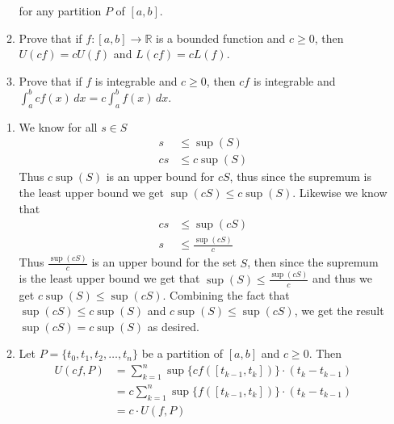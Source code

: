 \documentclass[11pt]{exam}
\newcommand{\sntk}{\sum_{k=1}^{n}}
\begin{document}
\begin{enumerate}
\begin{enumerate}
                for any partition \( P \) of \( [a, b] \).
                \item Prove that if \( f : [a, b] \rightarrow \mathbb{R} \) is a bounded function and \( c \geq 0 \), then \( U(cf) = cU(f) \) and \( L(cf) = cL(f) \).
                \item Prove that if \( f \) is integrable and \( c \geq 0 \), then \( cf \) is integrable and
                \( \int_{a}^{b} cf(x) \,dx = c \int_{a}^{b} f(x) \,dx \).
            \end{enumerate}
                \begin{solution}
                    \begin{enumerate}
                        \item We know for all $s \in S$
                            \begin{align*}
                                s &\leq \sup(S) \\
                                cs &\leq c\sup(S) 
                            \end{align*}
                            Thus $c\sup(S)$ is an upper bound for $cS$, thus since the supremum is the least upper bound we get $\sup(cS) \leq c\sup(S)$. Likewise we know that 
                            \begin{align*}
                                cs &\leq \sup(cS) \\
                                s &\leq \frac{\sup(cS)}{c}
                            \end{align*}
                            Thus $\frac{\sup(cS)}{c}$ is an upper bound for the set $S$, then since the supremum is the least upper bound we get that $\sup(S) \leq \frac{\sup(cS)}{c}$ and thus we get $c\sup(S) \leq \sup(cS)$. Combining the fact that $\sup(cS) \leq c\sup(S)$ and  $c\sup(S) \leq \sup(cS)$, we get the result $\sup(cS) = c\sup(S)$ as desired.
                        \item Let $P = \{t_0, t_1, t_2, \ldots , t_n\}$ be a partition of $[a, b]$ and $c \geq 0$. Then 
                            \begin{align*}
                                U(cf, P) &= \sntk \sup\{cf([t_{k-1}, t_k])\} \cdot (t_k - t_{k-1}) \\
                                        &= c \sntk \sup\{f([t_{k-1}, t_k])\} \cdot (t_k - t_{k-1}) \\
                                        &= c \cdot U(f, P)
                            \end{align*}

\end{enumerate}
\end{solution}
\end{enumerate}
\end{document}
